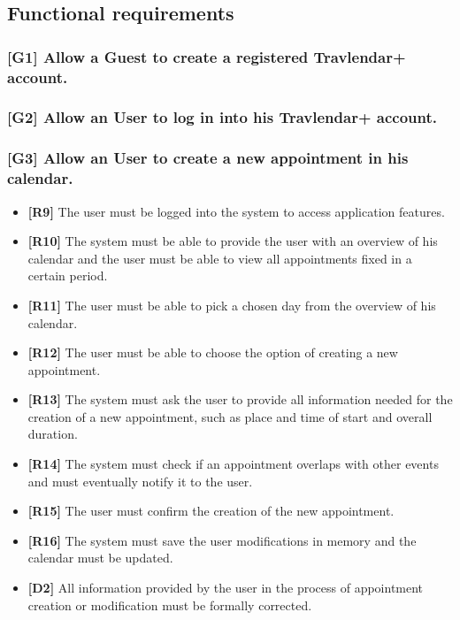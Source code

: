 \subsection{Functional requirements}
\subsubsection{[G1] Allow a Guest to create a registered Travlendar+ account.}
\subsubsection{[G2] Allow an User to log in into his Travlendar+ account.}
\subsubsection{[G3] Allow an User to create a new appointment in his calendar.}
\begin{itemize}
	\item \textbf{[R9]} The user must be logged into the system to access application features.
	\item \textbf{[R10]} The system must be able to provide the user with an overview of his calendar and the user must be able to view all appointments fixed in a certain period.
	\item \textbf{[R11]} The user must be able to pick a chosen day from the overview of his calendar.
	\item \textbf{[R12]} The user must be able to choose the option of creating a new appointment.
	\item \textbf{[R13]} The system must ask the user to provide all information needed for the creation of a new appointment, such as place and time of start and overall duration.
	\item \textbf{[R14]} The system must check if an appointment overlaps with other events and must eventually notify it to the user.
	\item \textbf{[R15]} The user must confirm the creation of the new appointment.
	\item \textbf{[R16]} The system must save the user modifications in memory and the calendar must be updated.
	\item \textbf{[D2]} All information provided by the user in the process of appointment creation or modification must be formally corrected.
	
\end{itemize}
